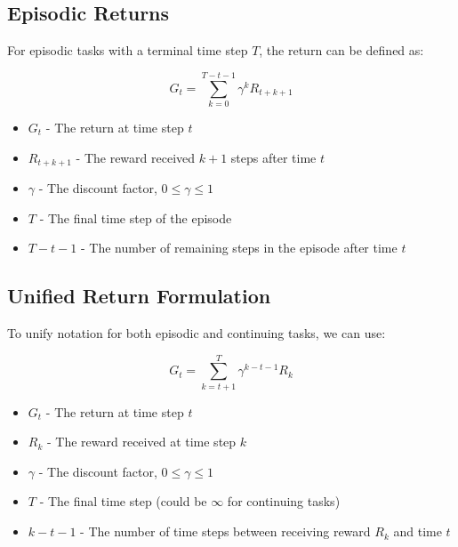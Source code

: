 \documentclass[12pt,a4paper]{article}
\begin{document}
\subsection{Episodic Returns}

For episodic tasks with a terminal time step $T$, the return can be defined as:

\begin{equation}
G_t = \sum_{k=0}^{T-t-1} \gamma^k R_{t+k+1}
\end{equation}

\begin{tcolorbox}[title=Notation Overview]
\begin{itemize}
    \item $G_t$ - The return at time step $t$
    \item $R_{t+k+1}$ - The reward received $k+1$ steps after time $t$
    \item $\gamma$ - The discount factor, $0 \leq \gamma \leq 1$
    \item $T$ - The final time step of the episode
    \item $T-t-1$ - The number of remaining steps in the episode after time $t$
\end{itemize}
\end{tcolorbox}

\subsection{Unified Return Formulation}

To unify notation for both episodic and continuing tasks, we can use:

\begin{equation}
G_t = \sum_{k=t+1}^{T} \gamma^{k-t-1} R_k
\end{equation}

\begin{tcolorbox}[title=Notation Overview]
\begin{itemize}
    \item $G_t$ - The return at time step $t$
    \item $R_k$ - The reward received at time step $k$
    \item $\gamma$ - The discount factor, $0 \leq \gamma \leq 1$
    \item $T$ - The final time step (could be $\infty$ for continuing tasks)
    \item $k-t-1$ - The number of time steps between receiving reward $R_k$ and time $t$
\end{itemize}
\end{tcolorbox}
\end{document}
